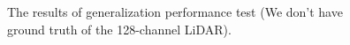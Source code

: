 \documentclass[letterpaper,10 pt,conference]{ieeeconf}  %
\begin{document}
\begin{figure}
    \centering
    \setlength{\belowcaptionskip}{-0.5cm}
    \quad
    \caption{The results of generalization performance test (We don't have ground truth of the 128-channel LiDAR).}
    \label{sim2rel}
\end{figure}
\end{document}
